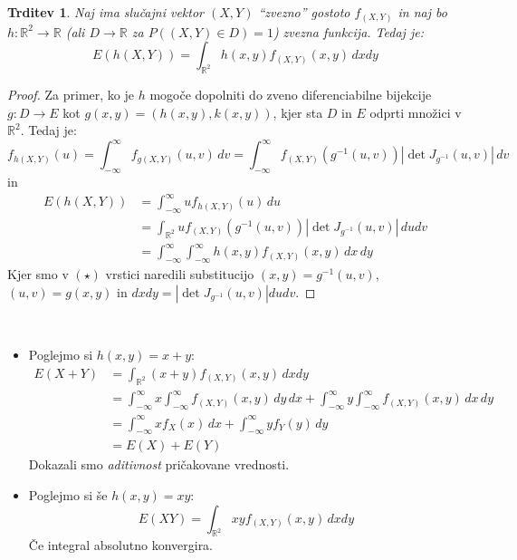 \documentclass[12pt]{book}
\theoremstyle{definition}
\theoremstyle{plain}
\theoremstyle{plain}
\newtheorem{trditev}{Trditev}
\theoremstyle{plain}
\theoremstyle{remark}
\begin{document}
\begin{trditev}
    Naj ima slučajni vektor $(X, Y)$ “zvezno” gostoto $f_{(X, Y)}$ in naj bo $h: \mathbb{R}^2 \to \mathbb{R}$ (ali $D \to \mathbb{R}$ za $P((X, Y) \in D)=1$) zvezna funkcija. Tedaj je:
$$
E(h(X, Y))=\int_{\mathbb{R}^2} h(x, y) f_{(X, Y)}(x, y) \, d x d y
$$
\end{trditev}

\begin{proof}
    Za primer, ko je $h$ mogoče dopolniti do zveno diferenciabilne bijekcije $g: D \to E$ kot $g(x, y)=(h(x, y), k(x, y))$, kjer sta $D$ in $E$ odprti množici v $\mathbb{R}^2$. Tedaj je:
    $$
    f_{h(X, Y)}(u)=\int_{-\infty}^{\infty} f_{g(X, Y)}(u, v) \, d v=\int_{-\infty}^{\infty} f_{(X, Y)}\left(g^{-1}(u, v)\right)  \left| \det J_{g^{-1}}(u, v) \right| \, d v
    $$
    in
    \begin{align*}
        E(h(X, Y))&=\int_{-\infty}^{\infty} u f_{h(X, Y)}(u) \, d u \\
        &=\int_{\mathbb{R}^2} u f_{(X, Y)}\left(g^{-1}(u, v)\right)\left| \det J_{g^{-1}}(u, v)\right| \, d u d v \tag{$\star$} \\
        &=\int_{-\infty}^{\infty} \int_{-\infty}^{\infty} h(x, y) f_{(X, Y)}(x, y) \, d x \,  d y    
    \end{align*}
    Kjer smo v $(\star)$ vrstici naredili substitucijo $(x, y)=g^{-1}(u, v)$, $(u,v) = g(x,y)$ in $d x d y=\left|\det J_{g^{-1}}(u, v)\right| d u d v$.
\end{proof}

\begin{zgled}
    ~

    \begin{itemize}
        \item Poglejmo si $h(x, y)=x+y$:
        $$
        \begin{aligned}
            E(X+Y)&=\int_{\mathbb{R}^2}(x+y) f_{(X, Y)}(x, y) \, d x d y \\
            &=\int_{-\infty}^{\infty} x \int_{-\infty}^{\infty} f_{(X, Y)}(x, y) \, d y \, d x+\int_{-\infty}^{\infty} y \int_{-\infty}^{\infty} f_{(X, Y)}(x, y) \, d x \, d y \\
            &=\int_{-\infty}^{\infty} x f_X(x) \, d x+\int_{-\infty}^{\infty} y f_Y(y) \, d y \\
            &=E(X)+E(Y)
        \end{aligned}
        $$
        Dokazali smo \emph{aditivnost} pričakovane vrednosti.
        \item Poglejmo si še $h(x, y)=x y$:
        $$
        E(X Y)=\int_{\mathbb{R}^2} xy f_{(X, Y)}(x, y) \,d x d y
        $$
        Če integral absolutno konvergira. 
    \end{itemize}
\end{zgled}
\end{document}
